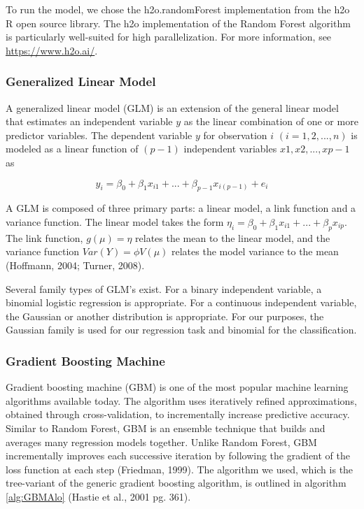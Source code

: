 \documentclass[12pt,]{article}
\begin{document}
To run the model, we chose the h2o.randomForest implementation from the
h2o R open source library. The h2o implementation of the Random Forest
algorithm is particularly well-suited for high parallelization. For more
information, see \url{https://www.h2o.ai/}.

\hypertarget{generalized-linear-model}{%
\subsubsection{Generalized Linear
Model}\label{generalized-linear-model}}

A generalized linear model (GLM) is an extension of the general linear
model that estimates an independent variable \(y\) as the linear
combination of one or more predictor variables. The dependent variable
\(y\) for observation \(i\) \((i = 1, 2, ..., n)\) is modeled as a
linear function of \((p - 1)\) independent variables
\(x1, x2,... ,xp-1\) as

\[
y_i = \beta_0+\beta_1x_{i1}+...+\beta_{p-1}x_{i(p-1)}+e_i
\]

A GLM is composed of three primary parts: a linear model, a link
function and a variance function. The linear model takes the form
\(\eta_i = \beta_0+\beta_1x_{i1}+...+\beta_{p}x_{ip}\). The link
function, \(g(\mu)=\eta\) relates the mean to the linear model, and the
variance function \(Var(Y) = \phi V(\mu)\) relates the model variance to
the mean (Hoffmann, 2004; Turner, 2008).

Several family types of GLM's exist. For a binary independent variable,
a binomial logistic regression is appropriate. For a continuous
independent variable, the Gaussian or another distribution is
appropriate. For our purposes, the Gaussian family is used for our
regression task and binomial for the classification.

\hypertarget{gradient-boosting-machine}{%
\subsubsection{Gradient Boosting
Machine}\label{gradient-boosting-machine}}

Gradient boosting machine (GBM) is one of the most popular machine
learning algorithms available today. The algorithm uses iteratively
refined approximations, obtained through cross-validation, to
incrementally increase predictive accuracy. Similar to Random Forest,
GBM is an ensemble technique that builds and averages many regression
models together. Unlike Random Forest, GBM incrementally improves each
successive iteration by following the gradient of the loss function at
each step (Friedman, 1999). The algorithm we used, which is the
tree-variant of the generic gradient boosting algorithm, is outlined in
algorithm \ref{alg:GBMAlo} (Hastie et al., 2001 pg. 361).
\end{document}
